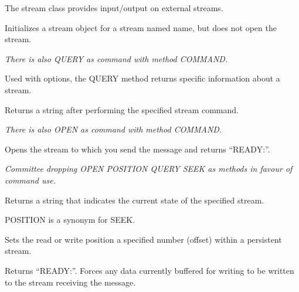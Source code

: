 The stream class provides input/output on external streams.



Initializes a stream object for a stream named name, but does not open
the stream.



\emph{There is also QUERY as command with method COMMAND.}

Used with options, the QUERY method returns specific information about a
stream.



Returns a string after performing the specified stream command.



\emph{There is also OPEN as command with method COMMAND.}

Opens the stream to which you send the message and returns ``READY:''.

\emph{Committee dropping OPEN POSITION QUERY SEEK as methods in favour
of command use.}



Returns a string that indicates the current state of the specified
stream.



POSITION is a synonym for SEEK.



Sets the read or write position a specified number (offset) within a
persistent stream.



Returns ``READY:''. Forces any data currently buffered for writing to be
written to the stream receiving the message.

